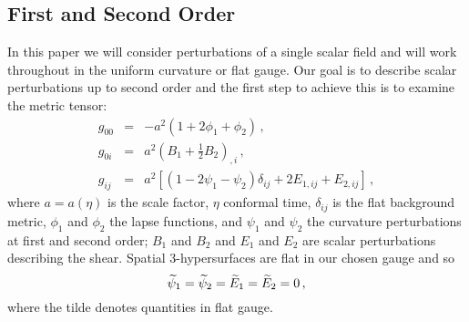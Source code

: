 \subsection{First and Second Order}
\label{sec:fosoperts-num}


In this paper we will consider perturbations of a single scalar field
and will work throughout in the uniform curvature or flat gauge. Our
goal is to describe scalar perturbations up to second order and the
first step to achieve this is to examine the metric tensor:
%
\begin{eqnarray}
\label{eq:metric1-num}
%
g_{00}&=&-a^2\left(1+2\phi_1+\phi_2\right) \,, \\
%
g_{0i}&=&a^2\left(B_1+\frac{1}{2}B_2\right)_{,i}\,, \\
%
g_{ij}&=&a^2\left[\left(1-2\psi_1-\psi_2\right)\delta_{ij}
+2E_{1,ij}+E_{2,ij}\right]\,,
\end{eqnarray}
%
where $a=a(\eta)$ is the scale factor, $\eta$ conformal time,
$\delta_{ij}$ is the flat background metric, $\phi_1$ and $\phi_2$ the
lapse functions, and $\psi_1$ and $\psi_2$ the curvature perturbations
at first and second order; $B_1$ and $B_2$ and $E_1$ and $E_2$ are
scalar perturbations describing the shear.
Spatial 3-hypersurfaces are flat in our chosen gauge and so
%  
\begin{equation}
 \label{eq:gauge-num}
\widetilde\psi_1=\widetilde\psi_2=\widetilde E_1=\widetilde E_2=0 \,,
\end{equation}
% 
where the tilde denotes quantities in flat gauge.


